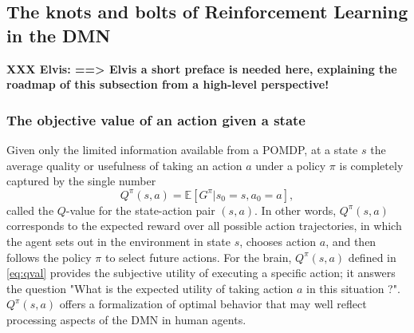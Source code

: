 \documentclass[10pt,letterpaper]{article}
\def\V{\mathbf{V}}
\begin{document}
\subsection{The knots and bolts of Reinforcement Learning in the DMN}
\textbf{XXX Elvis: ==> Elvis a short preface is needed here, explaining the roadmap of this subsection from a high-level perspective!}
\subsubsection{The objective value of an action given a state}
Given only the limited information available from a POMDP, at a state $s$ the average quality or usefulness of taking an action $a$ under a policy $\pi$ is completely captured by the single number
\begin{equation}
  \label{eq:qval}
  Q^{\pi}(s,a) = \mathbb E [G^\pi|s_0=s,a_0=a],
\end{equation}
called the $Q$-value for the state-action pair $(s,a)$.
In other words, $Q^{\pi}(s,a)$ corresponds to the expected reward
over all possible action trajectories, in which
the agent sets out in the environment in state
$s$, chooses action $a$, and then follows the policy $\pi$ to select future actions.
For the brain,
$Q^{\pi}(s, a)$ defined in \eqref{eq:qval} provides the subjective
utility of executing a specific action; it answers the question
"What is the expected utility of taking action $a$ in this situation ?".
$Q^{\pi}(s,a)$ offers a formalization of optimal behavior that
may well reflect processing aspects of the DMN in human agents.


\end{document}

